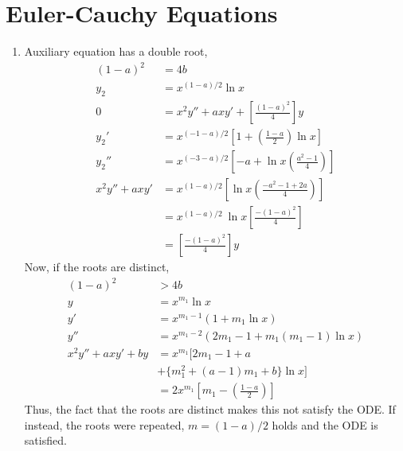 \section{Euler-Cauchy Equations}

\begin{enumerate}
    \item Auxiliary equation has a double root,
          \begin{align}
              (1-a)^{2}       & = 4b                                                                     \\
              y_{2}           & = x^{(1-a)/2}\ln x                                                       \\
              0               & =               x^{2}y'' + axy' + \left[ \frac{(1-a)^{2}}{4} \right]y    \\
              y_{2}'          & = x^{(-1-a)/2} \left[ 1 + \left( \frac{1-a}{2} \right)\ln x  \right]     \\
              y_{2}''         & = x^{(-3-a)/2}\left[ -a +\ln x \left( \frac{a^{2}-1}{4} \right) \right]  \\
              x^{2}y'' + axy' & = x^{(1-a)/2}\left[\ln x \left( \frac{-a^{2}-1 + 2a}{4} \right)  \right] \\
                              & = x^{(1-a)/2}\ \ln x\left[ \frac{-(1-a)^{2}}{4} \right]                  \\
                              & = \left[ \frac{-(1-a)^{2}}{4} \right] y
          \end{align}
          Now, if the roots are distinct,
          \begin{align}
              (1-a)^{2}            & > 4b                                                            \\
              y                    & = x^{m_{1}}\ln x                                                \\
              y'                   & = x^{m_{1}-1}(1 + m_{1}\ln x)                                   \\
              y''                  & = x^{m_{1} - 2}(2m_{1}-1 + m_{1}(m_{1} - 1)\ln x)               \\
              x^{2}y'' + axy' + by & = x^{m_{1}} \Big[ 2m_{1} - 1 + a                                \\
                                   & + \{m_{1}^{2} + (a-1)m_{1} + b\}\ln x \Big]                     \\
                                   & = 2x^{m_{1}}\left[ m_{1} - \left( \frac{1-a}{2} \right) \right]
          \end{align}
          Thus, the fact that the roots are distinct makes this not satisfy the ODE. If instead,
          the roots were repeated, $ m = (1-a)/2 $ holds and the ODE is satisfied.


\end{enumerate}
